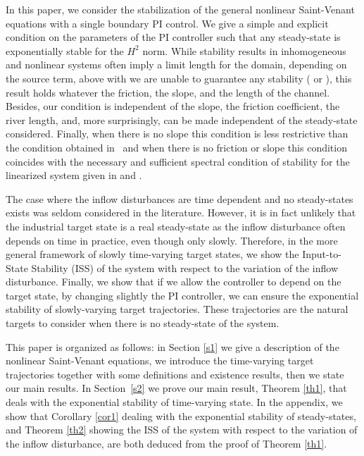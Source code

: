 \documentclass[11pt]{article}
\numberwithin{equation}{section}
\theoremstyle{definition}
\begin{document}
In this paper, we consider the stabilization of the general nonlinear Saint-Venant equations with a single boundary PI control.
We give a simple and explicit condition on the parameters of the PI controller such that any steady-state
is exponentially stable for the $H^{2}$ norm.
While stability results in inhomogeneous and nonlinear systems often imply a limit length for the domain, depending on the source term, above with we are unable to guarantee any stability (\cite{C1,C1_22,BastinCoron22,dos2008} or \cite[Chap.\,6]{BastinCoron1D}),
this result holds whatever the friction, the slope, and the length of the channel.
Besides, our condition is independent of the slope, the friction coefficient, the river length, and, more surprisingly, {can be made independent of }the steady-state considered.
Finally, when there is no slope this condition is less restrictive than the condition obtained in~\cite{BastinCoronPI}
and when there is no friction or slope this condition coincides with the {necessary and sufficient} spectral condition of stability for the linearized system given in \cite{BastinCoronTamasoiu2015} and \cite[Th.\,2.7]{BastinCoron1D}.\enlargethispage{.5\baselineskip}

The case where the inflow disturbances are time dependent and no steady-states exists was seldom considered in the literature.
However, it is in fact unlikely that the industrial target state is a real steady-state as the inflow disturbance often depends on time in practice,
even though only slowly.
Therefore,
in the more general framework of slowly time-varying target states,
we show the Input-to-State Stability (ISS) of the system with respect to the variation of the inflow disturbance.
Finally, we show that if
we allow the controller to depend on the target state,
by changing slightly the PI controller,
we can ensure
the exponential stability of slowly-varying target trajectories. {These trajectories} are the natural {targets} to consider when there is no steady-state of the system.

This paper is organized as follows: in Section \ref{s1} we give a description of the nonlinear Saint-Venant equations, we introduce the time-varying target trajectories together with some definitions and existence results, then we state our main results.
In Section~\ref{s2} we prove our main result, Theorem \ref{th1}, that deals with the exponential stability of time-varying state.
In the appendix, we show that Corollary \ref{cor1} dealing with the exponential stability of steady-states,
and Theorem \ref{th2} showing the ISS of the system with respect to the variation of the inflow disturbance,
are both deduced from the proof of Theorem \ref{th1}.
\end{document}

